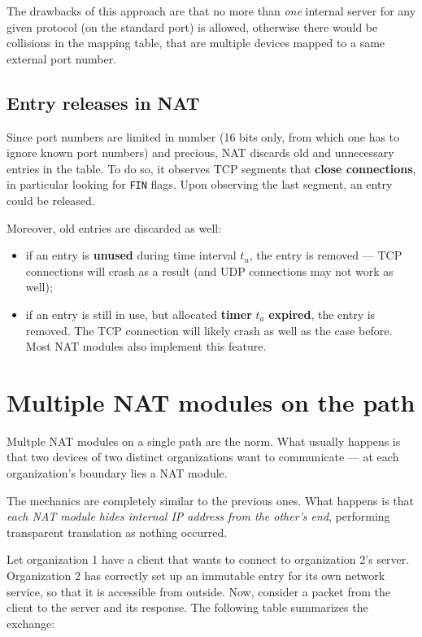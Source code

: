 \documentclass[10pt]{extreport}
\begin{document}
The drawbacks of this approach are that no more than \emph{one} internal server
for any given protocol (on the standard port) is allowed, otherwise there would
be collisions in the mapping table, that are multiple devices mapped to a same
external port number.

\subsection{Entry releases in NAT}

Since port numbers are limited in number (16 bits only, from which one has to
ignore known port numbers) and precious, NAT discards old and unnecessary
entries in the table. To do so, it observes TCP segments that \textbf{close
connections}, in particular looking for \texttt{FIN} flags. Upon observing the last segment, an entry could be released. 

Moreover, old entries are discarded as well:
\begin{itemize}
    \item if an entry is \textbf{unused} during time interval $t_{u}$, the
        entry is removed --- TCP connections will crash as a result (and UDP
        connections may not work as well);
    \item if an entry is still in use, but allocated \textbf{timer} $t_{a}$
        \textbf{expired}, the entry is removed. The TCP connection will likely
        crash as well as the case before. Most NAT modules also implement this
        feature.
\end{itemize}

\section{Multiple NAT modules on the path}

Multple NAT modules on a single path are the norm. What usually happens is that two devices of two distinct organizations want to communicate --- at each organization's boundary lies a NAT module. 

The mechanics are completely similar to the previous ones. What happens is that
\emph{each NAT module hides internal IP address from the other's end},
performing transparent translation as nothing occurred.

Let organization 1 have a client that wants to connect to organization 2's
server. Organization 2 has correctly set up an immutable entry for its own network
service, so that it is accessible from outside. Now, consider a packet from the
client to the server and its response. The following table summarizes the
exchange:
\end{document}

